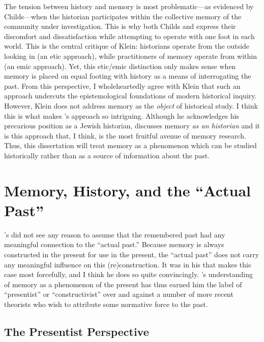 The tension between history and memory is most problematic---as evidenced by Childs---when the historian participates within the collective memory of the community under investigation. This is why both Childs and \yerushalmi express their discomfort and dissatisfaction while attempting to operate with one foot in each world. This is the central critique of Klein: historians operate from the outside looking in (an etic approach), while practitioners of memory operate from within (an emic approach). Yet, this etic/emic distinction only makes sense when memory is placed on equal footing with history as a means of interrogating the past. From this perspective, I wholeheartedly agree with Klein that such an approach undercuts the epistemological foundations of modern historical inquiry. However, Klein does not address memory as the \emph{object} of historical study. I think this is what makes \yerushalmi's approach so intriguing. Although he acknowledges his precarious position as a Jewish historian, \yerushalmi discusses memory \emph{as an historian} and it is this approach that, I think, is the most fruitful avenue of memory research. Thus, this dissertation will treat memory as a phenomenon which can be studied historically rather than as a source of information about the past.

\section{Memory, History, and the ``Actual Past''}

\halbwachs's did not see any reason to assume that the remembered past had any meaningful connection to the ``actual past.'' Because memory is always constructed in the present for use in the present, the ``actual past'' does not carry any meaningful influence on this (re)construction. It was in his  that \halbwachs makes this case most forcefully, and I think he does so quite convincingly. \halbwachs's understanding of memory as a phenomenon of the present has thus earned him the label of ``presentist'' or ``constructivist'' over and against a number of more recent theorists who wish to attribute some normative force to the past.%
    \autocite[27--30]{coser_halbwachs1992}  

\subsection{The Presentist Perspective}  

